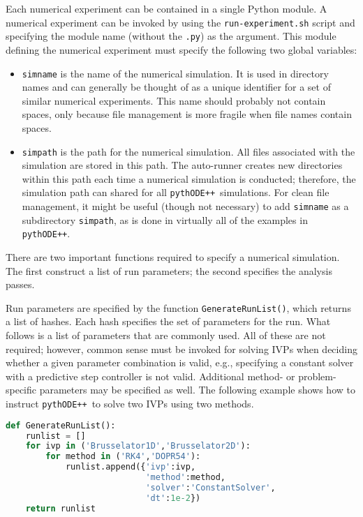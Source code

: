 \documentclass[11pt]{article}
\newcommand{\pypp}{\texttt{pythODE++}}
\begin{document}
Each numerical experiment can be contained in a single Python
module. A numerical experiment can be invoked by using the
\verb=run-experiment.sh= script and specifying the module name
(without the \verb=.py=) as the argument. This module defining the
numerical experiment must specify the following two global variables:
\begin{itemize}
\item \verb=simname= is the name of the numerical simulation. It is
  used in directory names and can generally be thought of as a unique
  identifier for a set of similar numerical experiments. This name
  should probably not contain spaces, only because file management is
  more fragile when file names contain spaces.
\item \verb=simpath= is the path for the numerical simulation. All
  files associated with the simulation are stored in this path. The
  auto-runner creates new directories within this path each time a
  numerical simulation is conducted; therefore, the simulation path
  can shared for all \pypp\ simulations. For clean file management, it
  might be useful (though not necessary) to add \verb=simname= as a
  subdirectory \verb=simpath=, as is done in virtually all of the
  examples in \pypp.
\end{itemize}

There are two important functions required to specify a numerical
simulation. The first construct a list of run parameters; the second
specifies the analysis passes.

Run parameters are specified by the function \verb=GenerateRunList()=,
which returns a list of hashes. Each hash specifies the set of
parameters for the run. What follows is a list of parameters that are
commonly used. All of these are not required; however, common sense
must be invoked for solving IVPs when deciding whether a given
parameter combination is valid, e.g., specifying a constant solver
with a predictive step controller is not valid. Additional method- or
problem-specific parameters may be specified as well. The following
example shows how to instruct \pypp\ to solve two IVPs using two
methods.
\begin{lstlisting}[tabsize=4,language=Python]
def GenerateRunList():
	runlist = []
	for ivp in ('Brusselator1D','Brusselator2D'):
		for method in ('RK4','DOPR54'):
			runlist.append({'ivp':ivp,
							'method':method,
							'solver':'ConstantSolver',
							'dt':1e-2})
	return runlist
\end{lstlisting}
\end{document}
